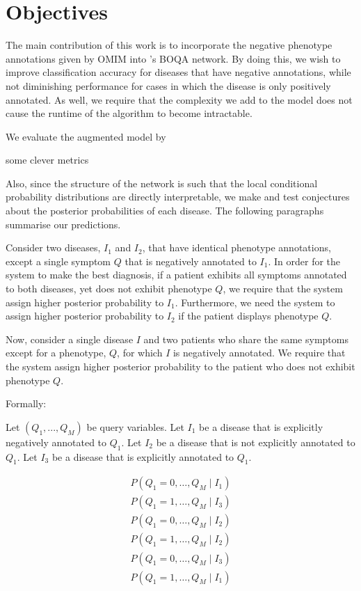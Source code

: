 \section{Objectives}
\label{sec:obj}

The main contribution of this work is to incorporate the negative phenotype
annotations given by OMIM \cite{hamosh2005online} into
\citeauthor{kohler2014hpo}'s BOQA network.
By doing this, we wish to improve classification accuracy for diseases that
have negative annotations, while not diminishing performance for cases in which
the disease is only positively annotated.
As well, we require that the complexity we add to the model does not cause the
runtime of the algorithm to become intractable.

We evaluate the augmented model by

some clever metrics

Also, since the structure of the network is such that the local conditional
probability distributions are directly interpretable, we make and test
conjectures about the posterior probabilities of each disease. 
The following paragraphs summarise our predictions.

Consider two diseases, $I_1$ and $I_2$, that have identical phenotype
annotations, except a single symptom $Q$ that is negatively annotated to $I_1$.
In order for the system to make the best diagnosis, if a patient exhibits all
symptoms annotated to both diseases, yet does not exhibit phenotype $Q$, we
require that the system assign higher posterior probability to $I_1$.
Furthermore, we need the system to assign higher posterior probability to $I_2$
if the patient displays phenotype $Q$.

Now, consider a single disease $I$ and two patients who share the same symptoms
except for a phenotype, $Q$, for which $I$ is negatively annotated. We require that
the system assign higher posterior probability to the patient who does not
exhibit phenotype $Q$.


Formally:

Let $(Q_1, ..., Q_M)$ be query variables.
Let $I_1$ be a disease that is explicitly negatively annotated to $Q_1$.
Let $I_2$ be a disease that is not explicitly annotated to $Q_1$.
Let $I_3$ be a disease that is explicitly annotated to $Q_1$.

\begin{align*}
    P(Q_1 = 0, \hdots, Q_M \mid I_1) \\
    P(Q_1 = 1, \hdots, Q_M \mid I_3) \\
    P(Q_1 = 0, \hdots, Q_M \mid I_2) \\
    P(Q_1 = 1, \hdots, Q_M \mid I_2) \\
    P(Q_1 = 0, \hdots, Q_M \mid I_3) \\
    P(Q_1 = 1, \hdots, Q_M \mid I_1) 
\end{align*}

